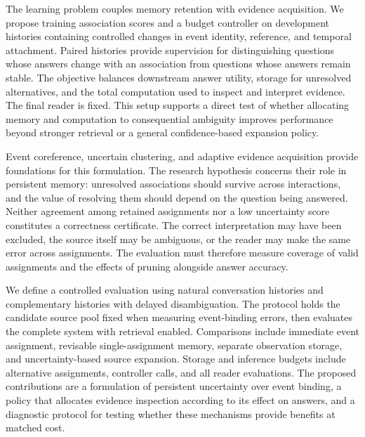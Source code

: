 The learning problem couples memory retention with evidence acquisition. We propose training association scores and a budget controller on development histories containing controlled changes in event identity, reference, and temporal attachment. Paired histories provide supervision for distinguishing questions whose answers change with an association from questions whose answers remain stable. The objective balances downstream answer utility, storage for unresolved alternatives, and the total computation used to inspect and interpret evidence. The final reader is fixed. This setup supports a direct test of whether allocating memory and computation to consequential ambiguity improves performance beyond stronger retrieval or a general confidence-based expansion policy.

Event coreference, uncertain clustering, and adaptive evidence acquisition provide foundations for this formulation. The research hypothesis concerns their role in persistent memory: unresolved associations should survive across interactions, and the value of resolving them should depend on the question being answered. Neither agreement among retained assignments nor a low uncertainty score constitutes a correctness certificate. The correct interpretation may have been excluded, the source itself may be ambiguous, or the reader may make the same error across assignments. The evaluation must therefore measure coverage of valid assignments and the effects of pruning alongside answer accuracy.

We define a controlled evaluation using natural conversation histories and complementary histories with delayed disambiguation. The protocol holds the candidate source pool fixed when measuring event-binding errors, then evaluates the complete system with retrieval enabled. Comparisons include immediate event assignment, revisable single-assignment memory, separate observation storage, and uncertainty-based source expansion. Storage and inference budgets include alternative assignments, controller calls, and all reader evaluations. The proposed contributions are a formulation of persistent uncertainty over event binding, a policy that allocates evidence inspection according to its effect on answers, and a diagnostic protocol for testing whether these mechanisms provide benefits at matched cost.
